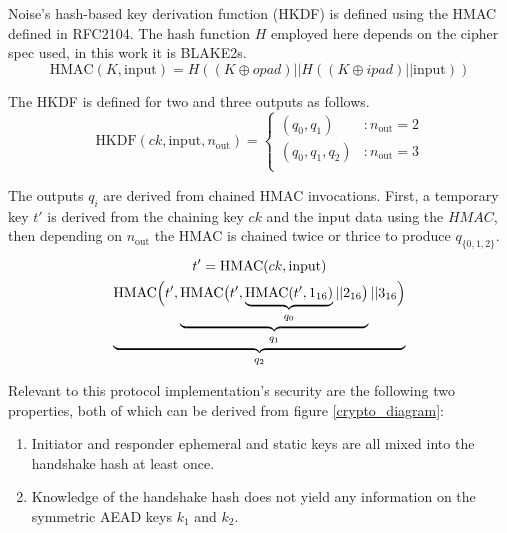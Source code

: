 \documentclass[12pt,a4paper,notitlepage]{article}
\begin{document}
Noise's hash-based key derivation function (HKDF) is defined using the HMAC defined in RFC2104\cite{rfc2104}. The hash
function $H$ employed here depends on the cipher spec used, in this work it is BLAKE2s.
\begin{equation}
	\text{HMAC}(K, \text{input}) = H\left(\left(K \oplus opad\right)
		|| H\left(\left(K \oplus ipad\right) || \text{input} \right)\right)
\end{equation}

The HKDF is defined for two and three outputs as follows.
\begin{equation}
	\text{HKDF}(ck, \text{input}, n_\text{out}) =
		\left\{\begin{array}{ll}
			(q_0, q_1) &: n_\text{out} = 2\\
			(q_0, q_1, q_2) &: n_\text{out} = 3\\
		\end{array}\right.
\end{equation}

The outputs $q_i$ are derived from chained HMAC invocations. First, a temporary key $t'$ is derived from the chaining key $ck$
and the input data using the $HMAC$, then depending on $n_\text{out}$ the HMAC is chained twice or thrice to produce
$q_{\{0,1,2\}}$.
\begin{gather}
	t' = \text{HMAC}(ck, \text{input})\\
	\underbrace{\text{HMAC} \Bigl(t',
	\underbrace{\text{HMAC} \bigl(t',
	\underbrace{\text{HMAC} (t',
		   1_{16})}_{q_0}
		|| 2_{16}\bigr)}_{q_1}
		|| 3_{16}\Bigr)}_{q_2}
\end{gather}

Relevant to this protocol implementation's security are the following two properties, both of which can be derived from
figure \ref{crypto_diagram}:
\begin{enumerate}
\item Initiator and responder ephemeral and static keys are all mixed into the handshake hash at least once.\label{fp1}
\item Knowledge of the handshake hash does not yield any information on the symmetric AEAD keys $k_1$ and $k_2$.\label{fp2}
\end{enumerate}
\end{document}

